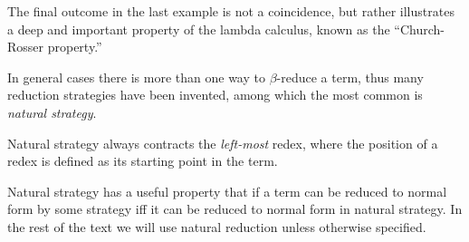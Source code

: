 \documentclass[../../../include/open-logic-section]{subfiles}
\begin{document}
The final outcome in the last example is not a coincidence, but rather
illustrates a deep and important property of the lambda calculus, known as the
``Church-Rosser property.''

\begin{digress}
  In general cases there is more than one way to $\beta$-reduce a
  term, thus many reduction strategies have been invented, among which
  the most common is \emph{natural strategy}.
  
  Natural strategy always contracts the \emph{left-most}
  redex, where the position of a redex is defined as its starting
  point in the term.

  Natural strategy has a useful property that if a term can be reduced
  to normal form by some strategy iff it can be reduced to normal form in
  natural strategy. In the rest of the text we will use natural
  reduction unless otherwise specified. 
\end{digress}
\end{document}
